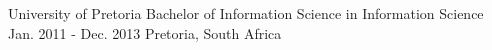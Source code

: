     \begin{cventries}
        \cventry{}{}{}{}{}

        \cventry
            {University of Pretoria}
            {Bachelor of Information Science in Information Science}
            {Jan. 2011 - Dec. 2013}
            {Pretoria, South Africa}
            {}

    \end{cventries}